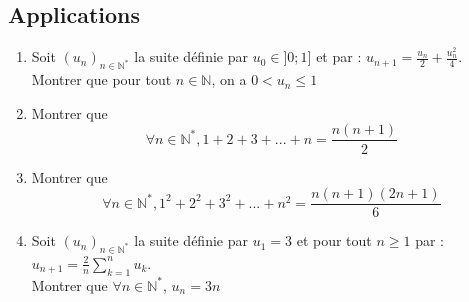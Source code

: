 \documentclass[12pt,a4paper]{article}
\begin{document}
\subsection*{Applications}
\begin{enumerate}
    \item Soit $(u_n)_{n \in \mathbb{N^*}}$ la suite définie par $u_0 \in ]0;1]$ et par : $ u_{n+1} = \displaystyle \frac{u_n}{2} + \frac{u_n^2}{4}$. \\
    Montrer que pour tout $n \in \mathbb{N}$, on a $0<u_n\le 1$ 
    \vspace{4mm}
    \item Montrer que 
    \[ \forall n \in \mathbb{N^*}, 1+2+3 + ...+ n= \frac{n(n+1)}{2}\]
    \vspace{4mm}
    \item Montrer que 
    \[ \forall n \in \mathbb{N^*}, 1^2+2^2+3^2 + ...+ n^2= \frac{n(n+1)(2n+1)}{6}\]
    \vspace{4mm}
    \item Soit $(u_n)_{n \in \mathbb{N^*}}$ la suite définie par $u_1 =3$ et pour tout $n\ge 1$ par : $ u_{n+1} = \displaystyle \frac{2}{n} \sum_{k=1}^n u_k $. \\
    Montrer que $\forall n \in \mathbb{N^*}$, $u_n =3n$

\end{enumerate}
\end{document}
